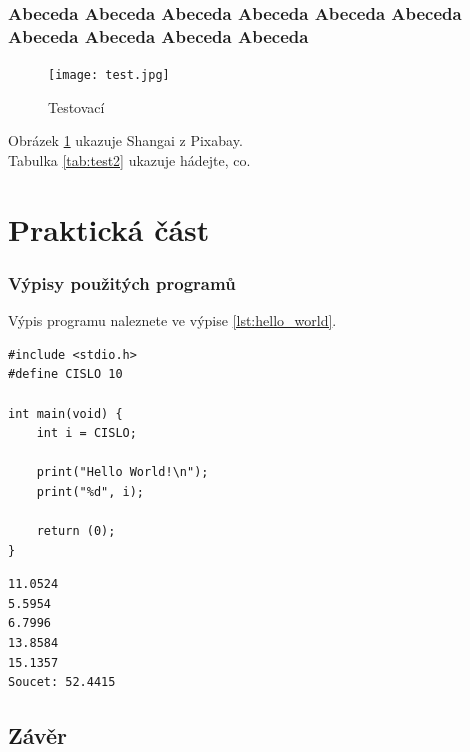 \documentclass[12pt]{report}
\begin{document}
\lipsum[2]

\section[X-krát Abeceda]{Abeceda Abeceda Abeceda Abeceda Abeceda Abeceda Abeceda Abeceda Abeceda Abeceda }
\begin{figure}
  \texttt{[image: test.jpg]}
  \caption{Testovací}
  \label{fig:test}
\end{figure}
Obrázek \ref{fig:test} ukazuje Shangai z Pixabay.\\
Tabulka \ref{tab:test2} ukazuje hádejte, co.
	
\lipsum[3]

\part{Praktická část} %

\section{Výpisy použitých programů}

\lipsum[1]	

Výpis programu   naleznete ve výpise \ref{lst:hello_world}.

\begin{lstlisting}[title={Program hello.c}, caption={hello.c}, label={lst:hello_world}]
#include <stdio.h>
#define CISLO 10

int main(void) {
	int i = CISLO;

	print("Hello World!\n");
	print("%d", i);

	return (0);
}
\end{lstlisting}

\lipsum[1]	

\begin{lstlisting}[numbers=none, title={Příklad výstupního souboru}]
11.0524
5.5954
6.7996
13.8584
15.1357
Soucet: 52.4415
\end{lstlisting}

\chapter*{Závěr}
	
\lipsum[1]
	
\end{document}
